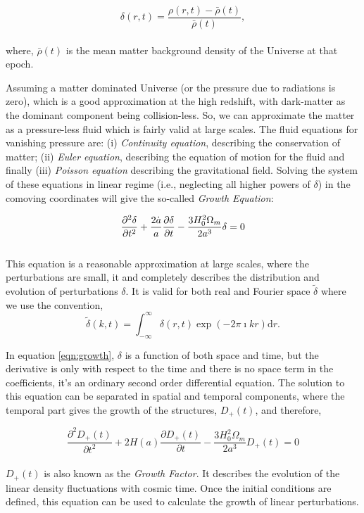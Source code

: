 \documentclass[
  11pt,
  twoside,
  openright,
  titlepage,
  headings=optiontoheadandtoc
]{scrbook}
\begin{document}
\begin{equation}
	\delta(r,t) = \dfrac{\rho(r,t) - \bar{\rho}(t)}{\bar{\rho}(t)},
\end{equation}
\\
where, $\bar{\rho}(t)$ is the mean matter background density 
of the Universe at that epoch. 

Assuming a matter dominated Universe (or the pressure due to radiations
is zero), which is a good approximation at the
high redshift, with dark-matter as the dominant component being collision-less. 
So, we can approximate the matter as a pressure-less fluid which is fairly 
valid at large scales. The fluid equations for vanishing pressure are: 
(i) {\it Continuity equation}, describing the conservation of matter; (ii) {\it Euler
equation}, describing the equation of motion for the fluid and finally (iii) 
{\it Poisson equation} describing the gravitational field. Solving the system of these
equations in linear regime (i.e., neglecting all higher powers of $\delta$) in 
the comoving coordinates will give
the so-called {\it Growth Equation}:

\begin{equation}
\centering
\dfrac{\partial^2 {\delta}}{\partial t^2} + \dfrac{2\dot{a}}{a} 
		\dfrac{\partial {\delta}}{\partial t}
		- \dfrac{3H_0^2 \Omega_m}{2a^3} {\delta} = 0
		\label{eqn:growth}
\end{equation}
\\
This equation is a reasonable approximation at large scales, where the perturbations
are small, it and completely describes the distribution and evolution of perturbations $\delta$. 
It is valid for both real and Fourier space $\tilde{\delta}$ where we use the convention,
\begin{equation}
	\tilde{\delta}(k,t) = \int_{-\infty}^{\infty} \delta(r,t) \exp(-2\pi \imath kr) \mathrm{d}r.
\end{equation}

In equation \ref{eqn:growth}, $\delta$ is a function of both space
and time, but the derivative is only with respect to the time and there is 
no space term in the coefficients, it's an ordinary second order differential equation.
The solution to this equation can be 
separated in spatial and temporal components, where the temporal part gives the 
growth of the structures, $D_+(t)$, and therefore,

\begin{equation}
	\dfrac{\partial^2 D_+(t)}{\partial t^2} + 2 H(a)
		\dfrac{\partial D_+(t)}{\partial t}
		- \dfrac{3H_0^2 \Omega_m}{2a^3} D_+(t) = 0
		\label{eqn:growthfactor}
\end{equation}
\\
$D_+(t)$ is also known as the {\it Growth Factor}. It describes the evolution of the
linear density fluctuations with cosmic time. Once the initial conditions
are defined, this equation can be used to calculate the growth of linear perturbations. 
\end{document}
